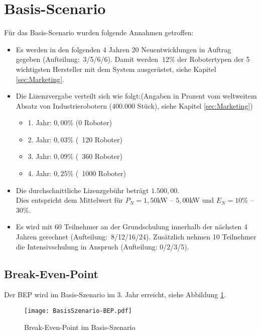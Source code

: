 \section{Basis-Scenario}
Für das Basis-Scenario wurden folgende Annahmen getroffen:
\begin{itemize}
	\item Es werden in den folgenden 4 Jahren 20 Neuentwicklungen in Auftrag gegeben (Aufteilung:~3/5/6/6). Damit werden $~12$\% der Robotertypen der 5 wichtigsten Hersteller mit dem System ausgerüstet, siehe Kapitel \ref{sec:Marketing}.
	\item Die Lizenzvergabe verteilt sich wie folgt:\newline (Angaben in Prozent vom weltweitem Absatz von Industrierobotern ($400.000$ Stück), siehe Kapitel \ref{sec:Marketing})
	\begin{itemize}
		\item 1. Jahr: $0,00$\% (0 Roboter)
		\item 2. Jahr: $0,03$\% (~120 Roboter)
		\item 3. Jahr: $0,09$\% (~360 Roboter)
		\item 4. Jahr: $0,25$\% (~1000 Roboter)
	\end{itemize}
	\item Die durchschnittliche Lizenzgebühr beträgt $1.500,00$\officialeuro.\\ Dies entspricht dem Mittelwert für $P_N = 1,50$kW -- $5,00$kW und $E_N = 10$\% -- $30$\%.
	\item Es wird mit 60 Teilnehmer an der Grundschulung innerhalb der nächsten 4 Jahren gerechnet (Aufteilung:~8/12/16/24). Zusätzlich nehmen 10 Teilnehmer die Intensivschulung in Anspruch (Aufteilung: 0/2/3/5).
\end{itemize}

\subsection{Break-Even-Point}
Der BEP wird im Basis-Szenario im 3. Jahr erreicht, siehe Abbildung \ref{fig:BasisSzenario-BEP}.
\begin{figure}[h]
	\centering
	\texttt{[image: BasisSzenario-BEP.pdf]}
	\caption{Break-Even-Point im Basis-Szenario}
	\label{fig:BasisSzenario-BEP}
\end{figure}


